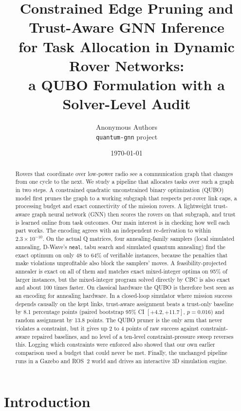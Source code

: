 \documentclass[11pt]{article}
\title{Constrained Edge Pruning and Trust-Aware GNN Inference\\
for Task Allocation in Dynamic Rover Networks:\\
a QUBO Formulation with a Solver-Level Audit}
\author{Anonymous Authors\\
\texttt{quantum-gnn} project}
\date{\today}
\newcommand{\code}[1]{\texttt{#1}}
\begin{document}
\maketitle

\begin{abstract}
Rovers that coordinate over low-power radio see a communication graph that
changes from one cycle to the next. We study a pipeline that allocates tasks
over such a graph in two steps. A constrained quadratic unconstrained binary
optimization (QUBO) model first prunes the graph to a working subgraph that
respects per-rover link caps, a processing budget and exact connectivity of
the mission rovers. A lightweight trust-aware graph neural network (GNN) then
scores the rovers on that subgraph, and trust is learned online from task
outcomes. Our main interest is in checking how well each part works. The
encoding agrees with an independent re-derivation to within
$2.3\times10^{-10}$. On the actual Q matrices, four annealing-family samplers
(local simulated annealing, D-Wave's \code{neal}, tabu search and simulated
quantum annealing) find the exact optimum on only 48 to 64\% of verifiable
instances, because the penalties that make violations unprofitable also block
the samplers' moves. A feasibility-projected annealer is exact on all of them
and matches exact mixed-integer optima on 95\% of larger instances, but the
mixed-integer program solved directly by CBC is also exact and about 100 times
faster. On classical hardware the QUBO is therefore best seen as an encoding
for annealing hardware. In a closed-loop simulator where mission success
depends causally on the kept links, trust-aware assignment beats a trust-only
baseline by 8.1 percentage points (paired bootstrap 95\% CI $[+4.2,+11.7]$,
$p=0.016$) and random assignment by 13.8 points. The QUBO pruner is the only
arm that never violates a constraint, but it gives up 2 to 4 points of raw
success against constraint-aware repaired baselines, and no level of a
ten-level constraint-pressure sweep reverses this. Logging which constraints
were enforced also showed that our own earlier comparison used a budget that
could never be met. Finally, the unchanged pipeline runs in a Gazebo and
ROS~2 world and drives an interactive 3D simulation engine.
\end{abstract}

\section{Introduction}
\end{document}
